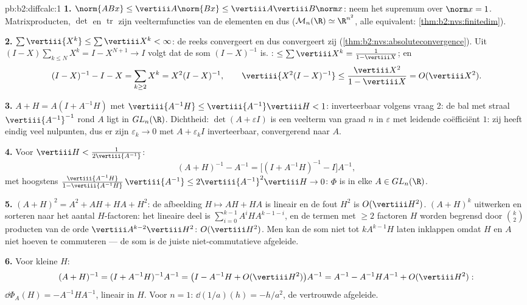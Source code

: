 \begin{solution}{pb:b2:diffcalc:1}
\textbf{1.} $\norm{ABx} \leq \vertiii A\norm{Bx} \leq \vertiii
A\vertiii B\norm x$: neem het supremum over $\norm x = 1$.
Matrixproducten, $\det$ en $\operatorname{tr}$ zijn
veeltermfuncties van de elementen en dus  ($\mathcal
M_n(\R) \simeq \R^{n^2}$, alle  equivalent:
\cref{thm:b2:nvs:finitedim}).

\textbf{2.} $\sum\vertiii{X^k} \leq \sum\vertiii X^k < \infty$: de
reeks convergeert  en dus convergeert zij
(\cref{thm:b2:nvs:absoluteconvergence}). Uit $(I - X)\sum_{k\leq
N}X^k = I - X^{N+1} \to I$ volgt dat de som $(I - X)^{-1}$ is.
: $\leq \sum\vertiii X^k = \frac{1}{1 - \vertiii X}$; en
\[
(I - X)^{-1} - I - X = \sum_{k\geq2}X^k = X^2(I - X)^{-1},
\qquad
\vertiii{X^2(I-X)^{-1}} \leq
\frac{\vertiii X^2}{1 - \vertiii X} = O(\vertiii X^2).
\]

\textbf{3.} $A + H = A(I + A^{-1}H)$ met $\vertiii{A^{-1}H} \leq
\vertiii{A^{-1}}\vertiii H < 1$: inverteerbaar volgens vraag 2: de
 bal met straal $\vertiii{A^{-1}}^{-1}$ rond $A$ ligt in
$GL_n(\R)$. Dichtheid: $\det(A + \varepsilon I)$ is een veelterm
van graad $n$ in $\varepsilon$ met leidende coëfficiënt $1$: zij
heeft eindig veel nulpunten, dus er zijn $\varepsilon_k \to 0$ met
$A + \varepsilon_kI$ inverteerbaar, convergerend naar $A$.

\textbf{4.} Voor $\vertiii H < \frac{1}{2\vertiii{A^{-1}}}$:
\[
(A + H)^{-1} - A^{-1}
= \bigl[(I + A^{-1}H)^{-1} - I\bigr]A^{-1},
\]
met  hoogstens $\frac{\vertiii{A^{-1}H}}{1 -
\vertiii{A^{-1}H}}\,\vertiii{A^{-1}} \leq
2\vertiii{A^{-1}}^2\vertiii H \to 0$: $\Phi$ is  in elke $A
\in GL_n(\R)$.

\textbf{5.} $(A+H)^2 = A^2 + AH + HA + H^2$: de afbeelding $H
\mapsto AH + HA$ is lineair en de fout $H^2$ is $O(\vertiii H^2)$.
$(A + H)^k$ uitwerken en sorteren naar het aantal $H$-factoren: het
lineaire deel is $\sum_{i=0}^{k-1}A^iHA^{k-1-i}$, en de termen met
$\geq 2$ factoren $H$ worden begrensd door $\binom k2$ producten
van de orde $\vertiii A^{k-2}\vertiii H^2$: $O(\vertiii H^2)$. Men
kan de som niet tot $kA^{k-1}H$ laten inklappen omdat $H$ en $A$
niet hoeven te commuteren --- de som is de juiste
niet-commutatieve afgeleide.

\textbf{6.} Voor kleine $H$:
\[
(A+H)^{-1} = (I + A^{-1}H)^{-1}A^{-1}
= \bigl(I - A^{-1}H + O(\vertiii H^2)\bigr)A^{-1}
= A^{-1} - A^{-1}HA^{-1} + O(\vertiii H^2) :
\]
$\dd\Phi_A(H) = -A^{-1}HA^{-1}$, lineair in $H$. Voor $n = 1$:
$\dd(1/a)(h) = -h/a^2$, de vertrouwde afgeleide.


\end{solution}
